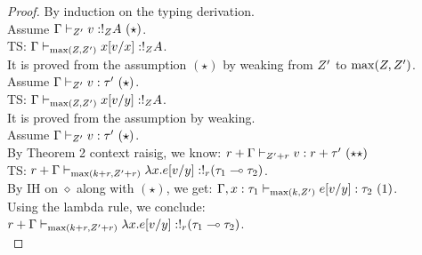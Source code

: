 \begin{proof}
By induction on the typing derivation.\\
  Assume  $\Gamma \vdash_{Z'} v : !_{Z} A ~(\star) $.\\
  TS:   $\Gamma \vdash_{\max(Z, Z')} x [v/x]  :
  !_{Z} A$.\\
  It is proved from the assumption $(\star)$ by weaking from $Z'$
  to $\max(Z,Z')$.\\

  Assume  $\Gamma \vdash_{Z'} v : \tau' ~(\star) $.\\
  TS:   $\Gamma \vdash_{\max(Z, Z')} x [v/y]  :
  !_{Z} A$.\\
  It is proved from the assumption by weaking.\\ 
 

  Assume  $\Gamma \vdash_{Z'} v : \tau' ~(\star) $.\\
  By Theorem 2 context raisig, we know: $r+\Gamma \vdash_{Z'+r} v : r+\tau' ~(\star\star) $\\
  TS:   $r+\Gamma \vdash_{\max(k+r, Z'+r)} \lambda x. e [v/y]  :
  !_{r}  ( \tau_1 \multimap \tau_2) $.\\
  By IH on $\diamond$ along with $(\star)$, we get:  $\Gamma,x:\tau_1 \vdash_{\max(k, Z')}  e [v/y]  :
  \tau_2 ~(1)$.\\
  Using the lambda rule, we conclude: \\
  $r+\Gamma \vdash_{\max(k+r, Z'+r)} \lambda x. e [v/y]  :
  !_{r}  ( \tau_1 \multimap \tau_2) $.\\


\end{proof}
